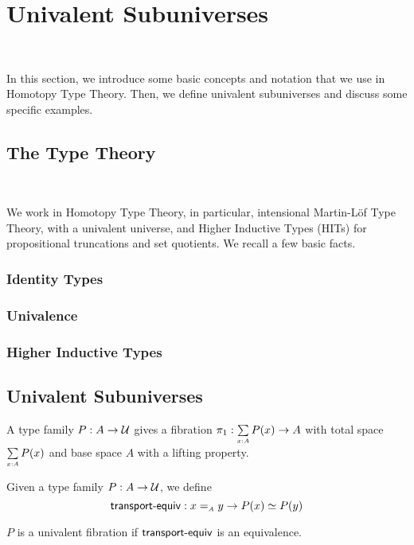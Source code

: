 \section{Univalent Subuniverses}~\label{sec:univalent}

In this section, we introduce some basic concepts and notation that we use in Homotopy Type Theory. Then, we define
univalent subuniverses and discuss some specific examples.

\subsection{The Type Theory}~\label{subsec:type-theory}

We work in Homotopy Type Theory, in particular, intensional Martin-L\"{o}f Type Theory, with a univalent universe, and
Higher Inductive Types (HITs) for propositional truncations and set quotients. We recall a few basic facts.

\subsubsection{Identity Types}

\subsubsection{Univalence}

\subsubsection{Higher Inductive Types}

\subsection{Univalent Subuniverses}

\begin{definition}
  A type family $P : A \to \mathcal{U}$ gives a fibration $\fst : \dsum{x:A}{P(x)} \to A$ with total space $\dsum{x:A}{P(x)}$
  and base space $A$ with a lifting property.
\end{definition}

\begin{definition}
  Given a type family $P : A \to \mathcal{U}$, we define
  \[
    \term{transport-equiv} : x \id_{A} y \to P(x) \eqv P(y)
  \]
\end{definition}

\begin{definition}
  $P$ is a univalent fibration if $\operatorname{\mathsf{transport-equiv}}$ is an equivalence.
\end{definition}

